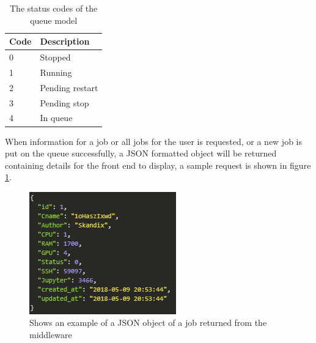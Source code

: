 \documentclass[../main.tex]{subfiles}
\begin{document}
\begin{table}[H]
    \centering
    \begin{tabular}{|l|l|}
    \hline
        \textbf{Code} & \textbf{Description} \\
        \hline
        0 & Stopped \\
        \hline
        1 & Running \\
        \hline
        2 & Pending restart \\
        \hline
        3 & Pending stop \\
        \hline
        4 & In queue \\
        \hline
    \end{tabular}
    \caption{The status codes of the queue model}
    \label{tab:status_codes}
\end{table}
When information for a job or all jobs for the user is requested, or a new job is put on the queue successfully, a JSON formatted object will be returned containing details for the front end to display, a sample request is shown in figure \ref{fig:middleware_job}.
\begin{figure}
    \centering
    \includegraphics{img/middleware_job.PNG}
    \caption{Shows an example of a JSON object of a job returned from the middleware}
    \label{fig:middleware_job}
\end{figure}
\end{document}
